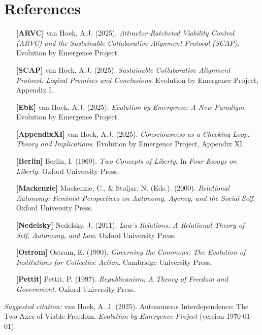 \documentclass[11pt,a4paper]{article}
\begin{document}
\section*{References}

\begin{itemize}[leftmargin=*,label={}]

\item[\textbf{[ARVC]}] van Hoek, A.J. (2025). \emph{Attractor-Ratcheted Viability Control (ARVC) and the Sustainable Collaborative Alignment Protocol (SCAP)}. Evolution by Emergence Project.

\item[\textbf{[SCAP]}] van Hoek, A.J. (2025). \emph{Sustainable Collaborative Alignment Protocol: Logical Premises and Conclusions}. Evolution by Emergence Project, Appendix I.

\item[\textbf{[EbE]}] van Hoek, A.J. (2025). \emph{Evolution by Emergence: A New Paradigm}. Evolution by Emergence Project.

\item[\textbf{[AppendixXI]}] van Hoek, A.J. (2025). \emph{Consciousness as a Checking Loop: Theory and Implications}. Evolution by Emergence Project, Appendix XI.

\item[\textbf{[Berlin]}] Berlin, I. (1969). \emph{Two Concepts of Liberty}. In \emph{Four Essays on Liberty}. Oxford University Press.

\item[\textbf{[Mackenzie]}] Mackenzie, C., \& Stoljar, N. (Eds.). (2000). \emph{Relational Autonomy: Feminist Perspectives on Autonomy, Agency, and the Social Self}. Oxford University Press.

\item[\textbf{[Nedelsky]}] Nedelsky, J. (2011). \emph{Law's Relations: A Relational Theory of Self, Autonomy, and Law}. Oxford University Press.

\item[\textbf{[Ostrom]}] Ostrom, E. (1990). \emph{Governing the Commons: The Evolution of Institutions for Collective Action}. Cambridge University Press.

\item[\textbf{[Pettit]}] Pettit, P. (1997). \emph{Republicanism: A Theory of Freedom and Government}. Oxford University Press.

\end{itemize}

\vspace{1em}
\noindent\textit{Suggested citation:} van Hoek, A. J. (2025). Autonomous Interdependence: The Two Axes of Viable Freedom. \emph{Evolution by Emergence Project} (version \today).
\end{document}
